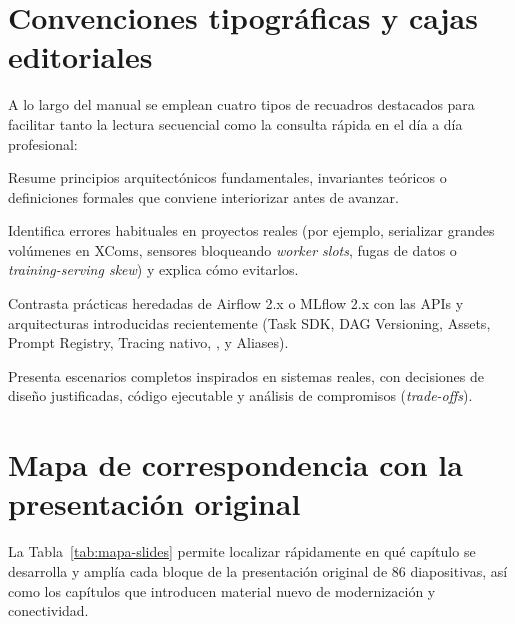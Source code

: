 \section*{Convenciones tipográficas y cajas editoriales}

A lo largo del manual se emplean cuatro tipos de recuadros destacados para facilitar tanto la lectura secuencial como la consulta rápida en el día a día profesional:

\begin{infobox}
Resume principios arquitectónicos fundamentales, invariantes teóricos o definiciones formales que conviene interiorizar antes de avanzar.
\end{infobox}

\begin{warningbox}
Identifica errores habituales en proyectos reales (por ejemplo, serializar grandes volúmenes en XComs, sensores bloqueando \textit{worker slots}, fugas de datos o \textit{training-serving skew}) y explica cómo evitarlos.
\end{warningbox}

\begin{modernbox}
Contrasta prácticas heredadas de Airflow 2.x o MLflow 2.x con las APIs y arquitecturas introducidas recientemente (Task SDK, DAG Versioning, Assets, Prompt Registry, Tracing nativo, ,  y Aliases).
\end{modernbox}

\begin{examplebox}
Presenta escenarios completos inspirados en sistemas reales, con decisiones de diseño justificadas, código ejecutable y análisis de compromisos (\textit{trade-offs}).
\end{examplebox}

\section*{Mapa de correspondencia con la presentación original}

La Tabla~\ref{tab:mapa-slides} permite localizar rápidamente en qué capítulo se desarrolla y amplía cada bloque de la presentación original de 86 diapositivas, así como los capítulos que introducen material nuevo de modernización y conectividad.

